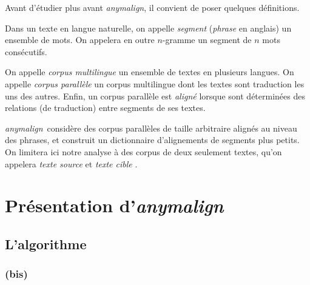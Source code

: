 \documentclass[a4paper,10pt]{article}
\newcommand{\anym}{\emph{anymalign}}
\begin{document}
Avant d'étudier plus avant \anym, il convient de poser quelques définitions.

Dans un texte en langue naturelle, on appelle \emph{segment} (\emph{phrase} en anglais) un ensemble de mots. On appelera en outre $n$-gramme un segment de $n$ mots consécutifs.

On appelle \emph{corpus multilingue} un ensemble de textes en plusieurs langues. On appelle \emph{corpus parallèle} un corpus multilingue dont les textes sont traduction les uns des autres. Enfin, un corpus parallèle est \emph{aligné} lorsque sont déterminées des relations (de traduction) entre segments de ses textes.

\anym~considère des corpus parallèles de taille arbitraire alignés au niveau des phrases, et construit un dictionnaire d'alignements de segments plus petits. On limitera ici notre analyse à des corpus de deux seulement textes, qu'on appelera \emph{texte source} et \emph{texte cible}
.





\section{Présentation d'\emph{anymalign}}

\subsection{L'algorithme}

\subsubsection{(bis)}
\end{document}
